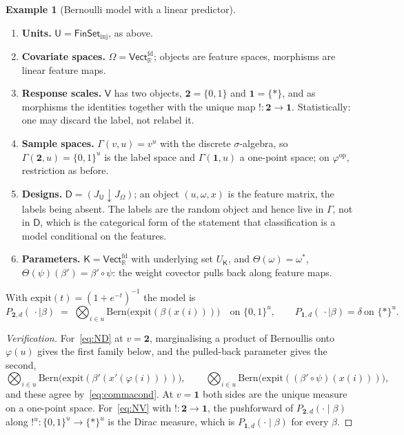 \documentclass[11pt,a4paper]{article}
\theoremstyle{plain}
\theoremstyle{definition}
\newtheorem{example}[theorem]{Example}
\theoremstyle{remark}
\newcommand{\cat}[1]{\mathsf{#1}}
\newcommand{\catU}{\cat{U}}
\newcommand{\catV}{\cat{V}}
\newcommand{\catO}{\cat{\Omega}}
\newcommand{\catD}{\cat{D}}
\newcommand{\catK}{\cat{K}}
\newcommand{\FinSet}{\cat{FinSet}}
\newcommand{\op}{\mathrm{op}}
\newcommand{\R}{\mathbb{R}}
\newcommand{\Vect}{\cat{Vect}}
\newcommand{\Bern}{\mathrm{Bern}}
\newcommand{\expit}{\mathrm{expit}}
\begin{document}
\begin{example}[Bernoulli model with a linear predictor]\label{ex:logreg}
\leavevmode
\begin{enumerate}
\item \textbf{Units.} $\catU = \FinSet_{\mathrm{inj}}$, as above.

\item \textbf{Covariate spaces.} $\catO = \Vect_{\R}^{\mathrm{fd}}$; objects
are feature spaces, morphisms are linear feature maps.

\item \textbf{Response scales.} $\catV$ has two objects,
$\mathbf{2}=\{0,1\}$ and $\mathbf{1}=\{*\}$, and as morphisms the identities
together with the unique map $!\colon\mathbf{2}\to\mathbf{1}$. Statistically:
one may discard the label, not relabel it.

\item \textbf{Sample spaces.} $\Gamma(v,u)=v^{u}$ with the discrete
$\sigma$-algebra, so $\Gamma(\mathbf{2},u)=\{0,1\}^{u}$ is the label space and
$\Gamma(\mathbf{1},u)$ a one-point space; on $\varphi^{\op}$, restriction as
before.

\item \textbf{Designs.} $\catD = (J_{\catU}\downarrow J_{\catO})$; an object
$(u,\omega,x)$ is the feature matrix, the labels being absent. The labels are
the random object and hence live in $\Gamma$, not in $\catD$, which is the
categorical form of the statement that classification is a model conditional
on the features.

\item \textbf{Parameters.} $\catK = \Vect_{\R}^{\mathrm{fd}}$ with underlying
set $U_{\catK}$, and $\Theta(\omega)=\omega^{*}$,
$\Theta(\psi)(\beta') = \beta'\circ\psi$: the weight covector pulls back along
feature maps.
\end{enumerate}

\noindent With $\expit(t)=(1+e^{-t})^{-1}$ the model is
\[
P_{\mathbf{2},d}(\,\cdot\mid\beta)
\;=\; \bigotimes_{i\in u}\Bern\!\bigl(\expit(\beta(x(i)))\bigr)
\quad\text{on }\{0,1\}^{u},
\qquad
P_{\mathbf{1},d}(\,\cdot\mid\beta) = \delta \ \text{on } \{*\}^{u}.
\]
\end{example}

\begin{proof}[Verification]
For~\eqref{eq:ND} at $v=\mathbf{2}$, marginalising a product of Bernoullis
onto $\varphi(u)$ gives the first family below, and the pulled-back parameter
gives the second,
\[
\bigotimes_{i\in u}\Bern\bigl(\expit(\beta'(x'(\varphi(i))))\bigr),
\qquad
\bigotimes_{i\in u}\Bern\bigl(\expit((\beta'\circ\psi)(x(i)))\bigr),
\]
and these agree by~\eqref{eq:commacond}. At $v=\mathbf{1}$ both sides are the
unique measure on a one-point space. For~\eqref{eq:NV} with
$!\colon\mathbf{2}\to\mathbf{1}$, the pushforward of
$P_{\mathbf{2},d}(\cdot\mid\beta)$ along
$!^{u}\colon\{0,1\}^{u}\to\{*\}^{u}$ is the Dirac measure, which is
$P_{\mathbf{1},d}(\cdot\mid\beta)$ for every $\beta$.
\end{proof}
\end{document}
